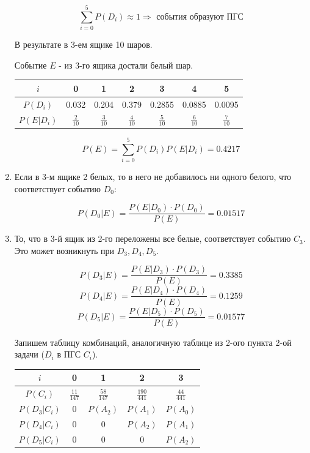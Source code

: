 \begin{enumerate}
	\[ \sum_{i=0}^{5} P(D_i) \approx 1 \Rightarrow \text{ события образуют ПГС} \]
	
	В результате в 3-ем ящике 10 шаров.
	
	Событие $E$ - из 3-го ящика достали белый шар.
	
	\begin{table}[h]
		\centering
		\begin{tabular}{|c|c|c|c|c|c|c|}
			\hline
			$i$        & 0              & 1              & 2              & 3              & 4              & 5              \\ \hline
			$P(D_i)$   & 0.032          & 0.204          & 0.379          & 0.2855         & 0.0885         & 0.0095         \\ \hline
			$P(E|D_i)$ & $\frac{2}{10}$ & $\frac{3}{10}$ & $\frac{4}{10}$ & $\frac{5}{10}$ & $\frac{6}{10}$ & $\frac{7}{10}$ \\ \hline
		\end{tabular}
	\end{table}
	
	\[ P(E) = \sum_{i=0}^{5} P(D_i)P(E|D_i) = 0.4217 \]
	
	\item Если в 3-м ящике 2 белых, то в него не добавилось ни одного белого, что соответствует событию $D_0$:
	
	\[ P(D_0|E) = \dfrac{P(E|D_0) \cdot P(D_0)}{P(E)} = 0.01517 \]
	
	\item То, что в 3-й ящик из 2-го переложены все белые, соответствует событию $C_3$. Это может возникнуть при $D_3, D_4, D_5$.
	
	\[ P(D_3|E) = \dfrac{P(E|D_3) \cdot P(D_3)}{P(E)} = 0.3385 \]
	\[ P(D_4|E) = \dfrac{P(E|D_4) \cdot P(D_4)}{P(E)} = 0.1259 \]
	\[ P(D_5|E) = \dfrac{P(E|D_5) \cdot P(D_5)}{P(E)} = 0.01577 \]
	
	Запишем таблицу комбинаций, аналогичную таблице из 2-ого пункта 2-ой задачи ($D_i$ в ПГС $C_i$).
	
	\begin{table}[h]
		\centering
		\begin{tabular}{|c|c|c|c|c|}
			\hline
			$i$          & 0                & 1                & 2                 & 3                \\ \hline
			$P(C_i)$     & $\frac{11}{147}$ & $\frac{58}{147}$ & $\frac{190}{441}$ & $\frac{44}{441}$ \\ \hline
			$P(D_3|C_i)$ & 0                & $P(A_2)$         & $P(A_1)$          & $P(A_0)$         \\ \hline
			$P(D_4|C_i)$ & 0                & 0                & $P(A_2)$          & $P(A_1)$         \\ \hline
			$P(D_5|C_i)$ & 0                & 0                & 0                 & $P(A_2)$         \\ \hline
		\end{tabular}
	\end{table}


\end{enumerate}
